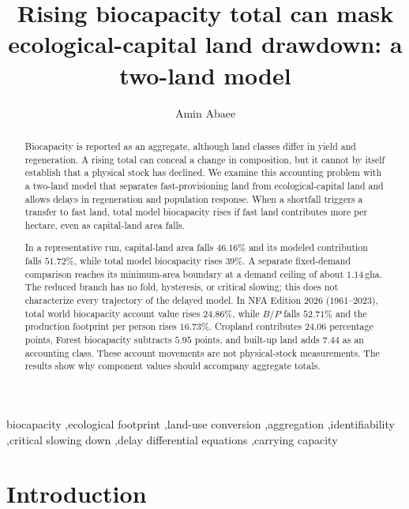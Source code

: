 \documentclass[preprint,12pt,authoryear]{elsarticle}
\begin{document}
\begin{frontmatter}

\title{Rising biocapacity total can mask ecological-capital land drawdown: a two-land model}

\author[1]{Amin Abaee}

\begin{abstract}
\footnotesize
Biocapacity is reported as an aggregate, although land classes differ in yield and regeneration. A rising total can conceal a change in composition, but it cannot by itself establish that a physical stock has declined. We examine this accounting problem with a two-land model that separates fast-provisioning land from ecological-capital land and allows delays in regeneration and population response. When a shortfall triggers a transfer to fast land, total model biocapacity rises if fast land contributes more per hectare, even as capital-land area falls.

In a representative run, capital-land area falls $46.16\%$ and its modeled contribution falls $51.72\%$, while total model biocapacity rises $39\%$. A separate fixed-demand comparison reaches its minimum-area boundary at a demand ceiling of about $1.14$\,gha. The reduced branch has no fold, hysteresis, or critical slowing; this does not characterize every trajectory of the delayed model. In NFA Edition 2026 (1961--2023), total world biocapacity account value rises $24.86\%$, while $B/P$ falls $52.71\%$ and the production footprint per person rises $16.73\%$. Cropland contributes $24.06$ percentage points, Forest biocapacity subtracts $5.95$ points, and built-up land adds $7.44$ as an accounting class. These account movements are not physical-stock measurements. The results show why component values should accompany aggregate totals.
\end{abstract}

\begin{keyword}
\footnotesize
biocapacity \sep ecological footprint \sep land-use conversion \sep aggregation \sep identifiability \sep critical slowing down \sep delay differential equations \sep carrying capacity
\end{keyword}

\end{frontmatter}

\section{Introduction}\label{sec:intro}
\end{document}
